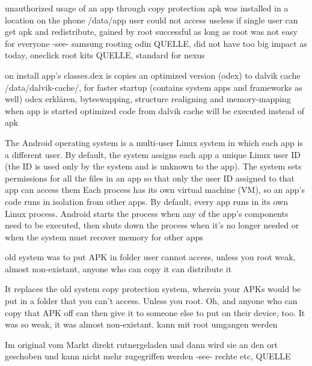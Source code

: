 %
unauthorized usage of an app through copy protection
apk was installed in a location on the phone /data/app user could not access
useless if single user can get apk and redistribute, gained by root
successful as long as root was not easy for everyone -see- samsung rooting odin QUELLE, did not have too big impact as today, oneclick root kits QUELLE, standard for nexus

on install app's classes.dex is copies an optimized version (odex) to dalvik cache /data/dalvik-cache/, for faster startup (contains system apps and frameworks as well)
odex erklären, byteswapping, structure realigning and memory-mapping
when app is started optimized code from dalvik cache will be executed instead of apk
\cite{munteanLicense}
%

%
The Android operating system is a multi-user Linux system in which each app is a different user.
By default, the system assigns each app a unique Linux user ID (the ID is used only by the system and is unknown to the app). The system sets permissions for all the files in an app so that only the user ID assigned to that app can access them
Each process has its own virtual machine (VM), so an app's code runs in isolation from other apps.
By default, every app runs in its own Linux process. Android starts the process when any of the app's components need to be executed, then shuts down the process when it's no longer needed or when the system must recover memory for other apps

\cite{developerFundamentals}
%

old system was to put APK in folder user cannot access, unless you root
weak, almost non-existant, anyone who can copy it can distribute it


It replaces the old system copy protection system, wherein your APKs would be put in a folder that you can't access. Unless you root. Oh, and anyone who can copy that APK off can then give it to someone else to put on their device, too. It was so weak, it was almost non-existant.\newline
kann mit root umgangen werden


Im original vom Markt direkt rutnergeladen und dann wird sie an den ort geschoben und kann nicht mehr zugegriffen werden -see- rechte etc, QUELLE\newline
